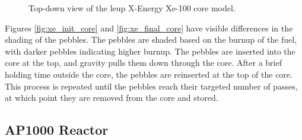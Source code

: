 \begin{figure}[H]
    \hfill
    \caption{Top-down view of the \gls{leup} X-Energy Xe-100 core model.}
    \label{fig:xe_core}
  \end{figure}

Figures \ref{fig:xe_init_core} and \ref{fig:xe_final_core} have visible differences in the shading of the pebbles. The pebbles are shaded based on the burnup of the fuel, with darker pebbles indicating higher burnup. The pebbles are inserted into the core at the top, and gravity pulls them down through the core. After a brief holding time outside the core, the pebbles are reinserted at the top of the core. This process is repeated until the pebbles reach their targeted number of passes, at which point they are removed from the core and stored.

\subsection{AP1000 Reactor}
\label{sec:ap}

